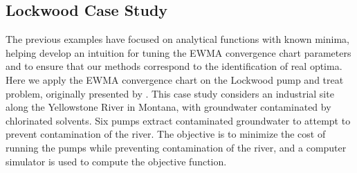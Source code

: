 \documentclass{article}
\begin{document}
%
%
\subsection{Lockwood Case Study}
\label{sec:lockwood}
%
%

The previous examples have focused on analytical functions with known 
minima, helping develop an intuition for tuning the 
EWMA convergence chart parameters and to ensure that our methods correspond to 
the identification of real optima. Here we apply the EWMA convergence
chart on the Lockwood pump and treat problem, originally presented by \cite{lockCite}. 
%
%
This case study considers an industrial site along the 
Yellowstone River in Montana, with groundwater contaminated by chlorinated 
solvents. Six pumps extract contaminated groundwater to attempt to
prevent contamination of the river. The objective is to
minimize the cost of running the pumps while preventing contamination
of the river, and a computer simulator is used to compute the
objective function.
\end{document}

